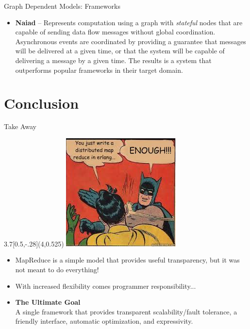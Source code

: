 \documentclass{beamer}
\begin{document}
\begin{frame}{Graph Dependent Models: Frameworks}

\begin{itemize}
\item \textbf{Naiad} -- Represents computation using a graph with \emph{stateful} nodes that are capable of sending data flow messages without global coordination.  Asynchronous events are coordinated by providing a guarantee that messages will be delivered at a given time, or that the system will be capable of delivering a message by a given time.  The results is a system that outperforms popular frameworks in their target domain.
\end{itemize}

\end{frame}


\section{Conclusion}

\begin{frame}{Take Away}

\begin{textblock}{3.7}[0.5,-.28](4,0.525)
\includegraphics[scale=.6]{batman.jpeg}
\end{textblock}

\begin{minipage}{6.5cm}
\begin{itemize}
\item MapReduce is a simple model that provides useful transparency, but it was not meant to do everything!
\item With increased flexibility comes programmer responsibility...
\item \textbf{The Ultimate Goal}\\
A single framework that provides transparent scalability/fault tolerance, a friendly interface, automatic optimization, and expressivity.
\end{itemize}
\end{minipage}

\end{frame}
\end{document}
